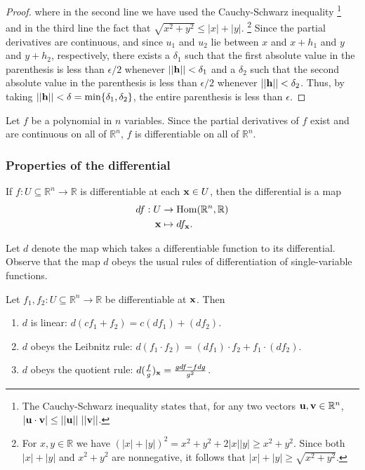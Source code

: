 \documentclass[12pt,letterpaper,reqno]{article}
\numberwithin{equation}{section}
\newcommand{\R}{\ensuremath{\mathbb R}}
\newcommand{\bu}{{\bf u}}
\newcommand{\bv}{{\bf v}}
\newcommand{\bx}{{\bf x}}
\begin{document}
{\begin{proof}
where in the second line we have used the Cauchy-Schwarz inequality \footnote{The Cauchy-Schwarz inequality states that, for any two vectors $\bu, \bv \in \R^n$, $|\bu \cdot \bv| \leq ||\bu|| \ ||\bv||$.} and in the third line the fact that $\sqrt{x^2+y^2}\leq |x|+|y|$. \footnote{For $x,y \in \R$ we have $(|x|+|y|)^2=x^2+y^2+2|x||y| \geq x^2+y^2$. Since both $|x|+|y|$ and $x^2+y^2$ are nonnegative, it follows that $|x|+|y| \geq \sqrt{x^2+y^2}$.} Since the partial derivatives are continuous, and since $u_1$ and $u_2$ lie between $x$ and $x+h_1$ and $y$ and $y+h_2$, respectively, there exists a $\delta_1$ such that the first absolute value in the parenthesis is less than $\epsilon/2$ whenever $||{\bf h}||<\delta_1$ and a $\delta_2$ such that the second absolute value in the parenthesis is less than $\epsilon/2$ whenever $||{\bf h}||<\delta_2$. Thus, by taking $||{\bf h}||<\delta=\text{min}\{\delta_1,\delta_2\}$, the entire parenthesis is less than $\epsilon$.
\end{proof}

\begin{example}
Let $f$ be a polynomial in $n$ variables. Since the partial derivatives of $f$ exist and are continuous on all of $\R^n$, $f$ is differentiable on all of $\R^n$.	
\end{example}


\subsubsection{Properties of the differential}
If $f:U \subseteq \R^n \to \R$ is differentiable at each $\bx \in U$, then the differential is a map
\begin{align*}
	df:U &\to \text{Hom}(\R^n,\R) \\
	\bx &\mapsto df_\bx.
\end{align*}

Let $d$ denote the map which takes a differentiable function to its differential. Observe that the map $d$ obeys the usual rules of differentiation of single-variable functions. 

\begin{thm}\label{thm:algebraic_properties_of_the_differential}
Let $f_1,f_2:U \subseteq \R^n \to \R$ be differentiable at $\bx$. Then
\begin{enumerate}[(1)]
	\item $d$ is linear: $d(cf_1+f_2)=c(df_1)+(df_2)$.
	\item $d$ obeys the Leibnitz rule: $d(f_1 \cdot f_2)=(df_1) \cdot f_2+f_1 \cdot (df_2)$.
	\item $d$ obeys the quotient rule: $d(\frac{f}{g})_\bx=\frac{g df-fdg}{g^2}$.
\end{enumerate}	
\end{thm}

}
\end{document}
